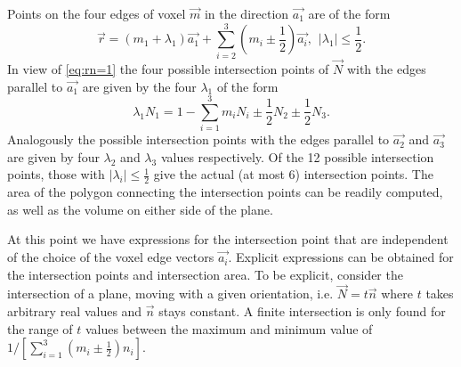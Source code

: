 Points on the four edges of voxel $\vec{m}$ in the direction $\vec{a_1}$ are of the form
\begin{equation}
\vec{r}=(m_1 + \lambda_1)  \vec{a_1}+\sum_{i=2}^{3}(m_i\pm\frac{1}{2}) \vec{a_i}, \hspace{5pt}  |\lambda_1 | \le \frac {1}{2}.
\end{equation}
In view of \ref{eq:rn=1} the four possible 
intersection points of $\vec{N}$ with the edges parallel to $\vec{a_1}$ are given by the four $\lambda_1$ of the form
\begin{equation}
\lambda_1 N_1 = 1 -\sum_{i=1}^{3}m_i N_i \pm\frac{1}{2} N_2 \pm\frac{1}{2} N_3.
\end{equation}
Analogously the possible intersection points with the edges parallel to $\vec{a_2}$ and $\vec{a_3}$ are given by four $\lambda_2$ and $\lambda_3$ values respectively. Of the 12 possible intersection points, those with $|\lambda_i | \le \frac {1}{2}$ give the actual (at most 6) intersection points. The area of the polygon connecting the intersection points can be readily computed, as well as the volume on either side of the plane. 

At this point we have expressions for the intersection point that are independent of the choice of the voxel edge vectors $\vec{a_i}$. Explicit expressions can be obtained for the intersection points and intersection area. To be explicit, consider the intersection of a plane, moving with a given orientation, i.e. $\vec{N} = t \vec{n}$ where $t$ takes arbitrary real values and $\vec{n}$ stays constant. A finite intersection is only found for the range of $t$ values between the maximum and
minimum value of $1/[\sum_{i=1}^{3} (m_i \pm\frac{1}{2}) n_i]$.
\newpage

